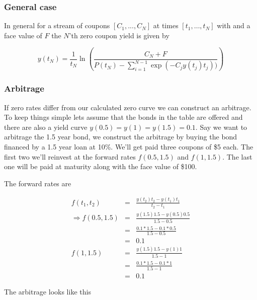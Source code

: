 \documentclass{tran-l}
\theoremstyle{definition}
\theoremstyle{remark}
\numberwithin{equation}{subsection}
\begin{document}
\subsubsection{General case}
In general for a stream of coupons $[C_1,...,C_N]$ at times $[t_1,\ldots,t_N]$ with and a face value of $F$ the $N$'th zero coupon yield is given by

\begin{equation}
y(t_N) = \frac{1}{t_N} \ln \left( \frac{C_N +F}{P(t_N)-\sum_{i=1}^{N-1}\exp(-C_{j}y(t_j)t_j))} \right)
\end{equation}

\subsubsection{Arbitrage}

If zero rates differ from our calculated zero curve we can construct an arbitrage. To keep things simple lets assume that the bonds in the table are offered and there are also a yield curve $y(0.5)=y(1)=y(1.5)=0.1$. Say we want to arbitrage the 1.5 year bond, we construct the arbitrage by buying the bond financed by a 1.5 year loan at 10\%. We'll get paid three coupons of \$5 each. The first two we'll reinvest at the forward rates $f(0.5,1.5)$ and $f(1,1.5)$. The last one will be paid at maturity along with the face value of \$100.

The forward rates are 

\begin{eqnarray*}
f(t_1,t_2) &=& \frac{y(t_2)t_2-y(t_1)t_1}{t_2-t_1}\\
\Rightarrow f(0.5,1.5) &=& \frac{y(1.5)1.5-y(0.5)0.5}{1.5-0.5}\\
&=& \frac{0.1*1.5-0.1*0.5}{1.5-0.5}\\
&=& 0.1\\
            f(1,1.5) &=& \frac{y(1.5)1.5-y(1)1}{1.5-1}\\
            &=& \frac{0.1*1.5-0.1*1}{1.5-1}\\
            &=& 0.1
\end{eqnarray*}


The arbitrage looks like this
\end{document}
